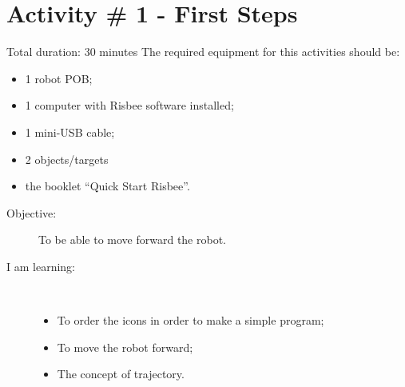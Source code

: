 \section{Activity \# 1 - First Steps}

Total duration: 30 minutes
The required equipment for this activities should be:
\begin{itemize}
\item 1 robot POB;
\item 1 computer with Risbee software installed;
\item 1 mini-USB cable;
\item 2 objects/targets
\item the booklet ``Quick Start Risbee''.
\end{itemize}
\frameboxend

\begin{description}
\item[Objective:] To be able to move forward the robot.
\item[I am learning:] \hfill \\ \vspace{-4ex}
  \begin{itemize}
  \item To order the icons in order to make a simple program;
  \item To move the robot forward;
  \item The concept of trajectory.
  \end{itemize}
\end{description}
\frameboxend

